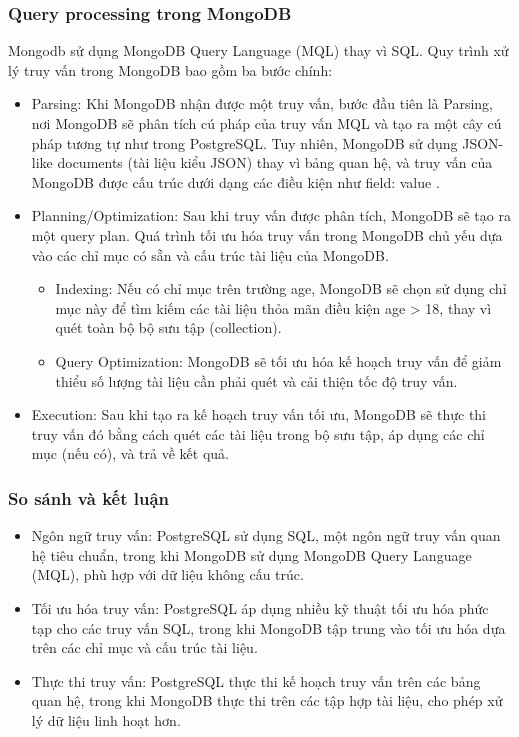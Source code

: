 \subsubsection{Query processing trong MongoDB}
\indent Mongodb sử dụng MongoDB Query Language (MQL) thay vì SQL. Quy trình xử lý truy vấn trong MongoDB bao gồm ba bước chính:
\begin{itemize}
    \item Parsing: Khi MongoDB nhận được một truy vấn, bước đầu tiên là Parsing, nơi MongoDB sẽ phân tích cú pháp của truy vấn MQL và tạo ra một cây cú pháp tương tự như trong PostgreSQL. Tuy nhiên, MongoDB sử dụng JSON-like documents (tài liệu kiểu JSON) thay vì bảng quan hệ, và truy vấn của MongoDB được cấu trúc dưới dạng các điều kiện như { field: value }.
    \item Planning/Optimization: Sau khi truy vấn được phân tích, MongoDB sẽ tạo ra một query plan. Quá trình tối ưu hóa truy vấn trong MongoDB chủ yếu dựa vào các chỉ mục có sẵn và cấu trúc tài liệu của MongoDB.
        \begin{itemize}
            \item Indexing: Nếu có chỉ mục trên trường age, MongoDB sẽ chọn sử dụng chỉ mục này để tìm kiếm các tài liệu thỏa mãn điều kiện age > 18, thay vì quét toàn bộ bộ sưu tập (collection).
            \item Query Optimization: MongoDB sẽ tối ưu hóa kế hoạch truy vấn để giảm thiểu số lượng tài liệu cần phải quét và cải thiện tốc độ truy vấn.
        \end{itemize}
    \item Execution: Sau khi tạo ra kế hoạch truy vấn tối ưu, MongoDB sẽ thực thi truy vấn đó bằng cách quét các tài liệu trong bộ sưu tập, áp dụng các chỉ mục (nếu có), và trả về kết quả.
\end{itemize}

\subsubsection{So sánh và kết luận}
\begin{itemize}
    \item Ngôn ngữ truy vấn: PostgreSQL sử dụng SQL, một ngôn ngữ truy vấn quan hệ tiêu chuẩn, trong khi MongoDB sử dụng MongoDB Query Language (MQL), phù hợp với dữ liệu không cấu trúc.
    \item Tối ưu hóa truy vấn: PostgreSQL áp dụng nhiều kỹ thuật tối ưu hóa phức tạp cho các truy vấn SQL, trong khi MongoDB tập trung vào tối ưu hóa dựa trên các chỉ mục và cấu trúc tài liệu.
    \item Thực thi truy vấn: PostgreSQL thực thi kế hoạch truy vấn trên các bảng quan hệ, trong khi MongoDB thực thi trên các tập hợp tài liệu, cho phép xử lý dữ liệu linh hoạt hơn.
\end{itemize}

